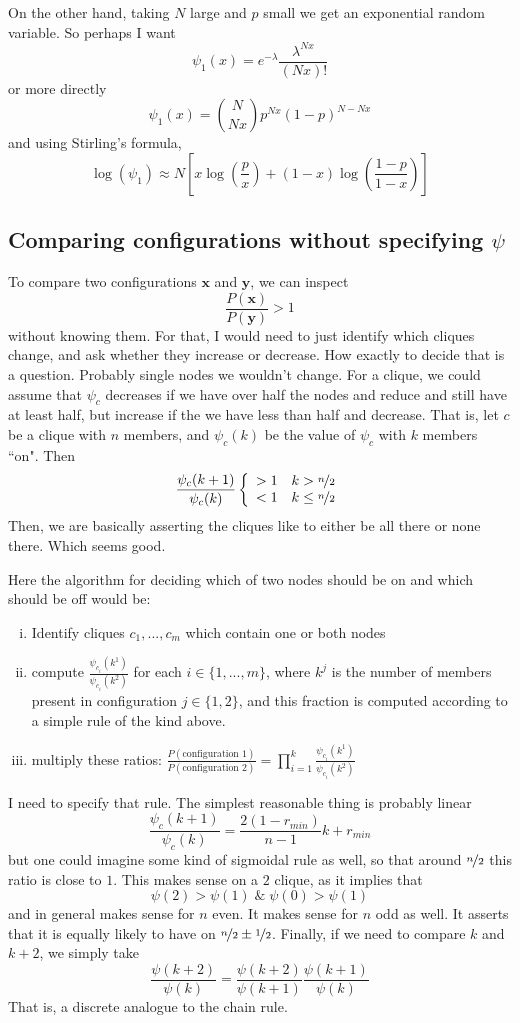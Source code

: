 \documentclass[10pt]{article}
\theoremstyle{definition}
\numberwithin{theorem}{section}
\numberwithin{definition}{section}
\numberwithin{lemma}{section}
\numberwithin{corollary}{section}
\numberwithin{clm}{section}
\numberwithin{rmk}{section}
\renewcommand{\b}{\bm}
\begin{document}
On the other hand, taking $N$ large and $p$ small we get an exponential random variable. So perhaps I want
\[
\psi_1(x) = e^{-\lambda}\frac{\lambda^{Nx}}{(Nx)!}
\]
or more directly
\[
\psi_1(x) = \binom{N}{Nx}p^{Nx}(1-p)^{N-Nx}
\]
and using Stirling's formula,
\[
\log(\psi_1) \approx N\left[x \log\left(\frac{p}{x}\right) + (1-x)\log\left(\frac{1-p}{1-x}\right)\right]
\]

\subsection{Comparing configurations without specifying $\psi$}
To compare two configurations $\b{x}$ and $\b{y}$, we can inspect
\[
\frac{P(\b{x})}{P(\b{y})} > 1
\]
without knowing them. For that, I would need to just identify which cliques change, and ask whether they increase or decrease. How exactly to decide that is a question. Probably single nodes we wouldn't change. For a clique, we could assume that $\psi_c$ decreases if we have over half the nodes and reduce and still have at least half, but increase if the we have less than half and decrease. That is, let $c$ be a clique with $n$ members, and $\psi_c(k)$ be the value of $\psi_c$ with $k$ members ``on". Then
\[
\frac{\psi_c(k+1)}{\psi_c(k)}   \left\{\begin{array}{c c}
>1 & k>\nicefrac{n}{2}\\
<1 & k\leq \nicefrac{n}{2}
\end{array}\right.
\]
Then, we are basically asserting the cliques like to either be all there or none there. Which seems good.

Here the algorithm for deciding which of two nodes should be on and which should be off would be:
\begin{enumerate}[(i)]
	\item Identify cliques $c_1,...,c_m$ which contain one or both nodes
	\item compute $\frac{\psi_{c_i}(k^1)}{\psi_{c_i}(k^2)}$ for each  $i \in \{1,...,m\}$, where $k^j$ is the number of members present in configuration $j \in \{1,2\}$, and this fraction is computed according to a simple rule of the kind above.
	\item multiply these ratios: $\frac{P(\text{configuration 1})}{P(\text{configuration 2})} = \prod_{i=1}^k \frac{\psi_{c_i}(k^1)}{\psi_{c_i}(k^2)}$
\end{enumerate}

I need to specify that rule. The simplest reasonable thing is probably linear
\[
\frac{\psi_c(k+1)}{\psi_c(k)} = \frac{2(1-r_{min})}{n - 1} k + r_{min}
\]
but one could imagine some kind of sigmoidal rule as well, so that around $\nicefrac{n}{2}$ this ratio is close to $1$. This makes sense on a $2$ clique, as it implies that
\[
\psi(2) > \psi(1) \; \& \; \psi(0) > \psi(1)
\]
and in general makes sense for $n$ even. It makes sense for $n$ odd as well. It asserts that it is equally likely to have on $\nicefrac{n}{2} \pm \nicefrac{1}{2}$. Finally, if we need to compare $k$ and $k+2$, we simply take
\[
\frac{\psi(k+2)}{\psi(k)} = \frac{\psi(k+2)}{\psi(k+1)}\frac{\psi(k+1)}{\psi(k)}
\]
That is, a discrete analogue to the chain rule.
\end{document}
